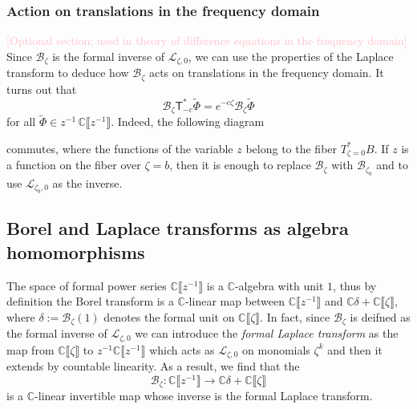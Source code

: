 \documentclass{article}
\newcommand{\C}{\mathbb{C}}
\newcommand{\series}[1]{\tilde{#1}}
\newcommand{\laplace}{\mathcal{L}}
\newcommand{\borel}{\mathcal{B}}
\theoremstyle{definition}
\theoremstyle{plain}
\begin{document}
\subsubsection{Action on translations in the frequency domain}
\textcolor{Pink}{[Optional section; used in theory of difference equations in the frequency domain]} Since $\borel_\zeta$ is the formal inverse of $\laplace_{\zeta,0}$, we can use the properties of the Laplace transform to deduce how $\borel_\zeta$ acts on translations in the frequency domain. It turns out that 
\[ \borel_\zeta \mathsf{T}_{-c}^* \series{\Phi} = e^{-c\zeta }\borel_\zeta \series{\Phi} \]
for all $\series{\Phi} \in z^{-1}\,\C\llbracket z^{-1} \rrbracket$.
Indeed, the following diagram
\begin{center}
\end{center}
commutes, where the functions of the variable $z$ belong to the fiber $T^*_{\zeta=0}B$. If $z$ is a function on the fiber over $\zeta=b$, then it is enough to replace $\borel_\zeta$ with $\borel_{\zeta_b}$ and to use  $\laplace_{\zeta_b,0}$ as the inverse. 
\subsection{Borel and Laplace transforms as algebra homomorphisms}\label{sec:borel-laplace-homom}
The space of formal power series $\C\llbracket z^{-1}\rrbracket$ is a $\C$-algebra with unit $1$, thus by definition the Borel transform is a $\C$-linear map between $\C\llbracket z^{-1}\rrbracket$ and $\C\delta +\C\llbracket\zeta\rrbracket$, where $\delta:=\borel_\zeta (1)$ denotes the formal unit on $\C\llbracket\zeta\rrbracket$. In fact, since $\borel_\zeta$ is deifned as the formal inverse of $\laplace_{\zeta,0}$ we can introduce the \textit{formal Laplace transform} as the map from $\C\llbracket \zeta\rrbracket$ to $z^{-1}\C\llbracket z^{-1}\rrbracket$ which acts as $\laplace_{\zeta,0}$ on monomials $\zeta^k$ and then it extends by countable linearity. As a result, we find that the \[\borel_\zeta\colon\C\llbracket z^{-1}\rrbracket\to\C\delta + \C\llbracket\zeta\rrbracket\] 
is a $\C$-linear invertible map whose inverse is the formal Laplace transform.
\end{document}
